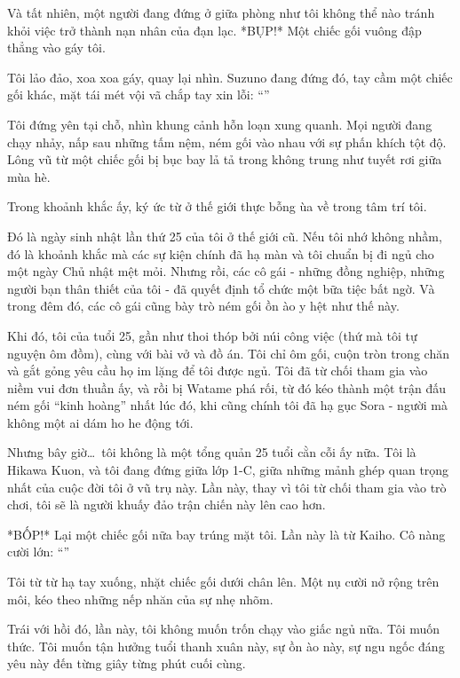 \documentclass[../main.tex]{subfiles}
\begin{document}
Và tất nhiên, một người đang đứng ở giữa phòng như tôi không thể nào tránh khỏi việc trở thành nạn nhân của đạn lạc. *BỤP!* Một chiếc gối vuông đập thẳng vào gáy tôi.

Tôi lảo đảo, xoa xoa gáy, quay lại nhìn. Suzuno đang đứng đó, tay cầm một chiếc gối khác, mặt tái mét vội vã chắp tay xin lỗi: ``''

Tôi đứng yên tại chỗ, nhìn khung cảnh hỗn loạn xung quanh. Mọi người đang chạy nhảy, nấp sau những tấm nệm, ném gối vào nhau với sự phấn khích tột độ. Lông vũ từ một chiếc gối bị bục bay lả tả trong không trung như tuyết rơi giữa mùa hè.

Trong khoảnh khắc ấy, ký ức từ ở thế giới thực bỗng ùa về trong tâm trí tôi.

Đó là ngày sinh nhật lần thứ 25 của tôi ở thế giới cũ. Nếu tôi nhớ không nhầm, đó là khoảnh khắc mà các sự kiện chính đã hạ màn và tôi chuẩn bị đi ngủ cho một ngày Chủ nhật mệt mỏi. Nhưng rồi, các cô gái \hll - những đồng nghiệp, những người bạn thân thiết của tôi - đã quyết định tổ chức một bữa tiệc bất ngờ. Và trong đêm đó, các cô gái cũng bày trò ném gối ồn ào y hệt như thế này.

Khi đó, tôi của tuổi 25, gần như thoi thóp bởi núi công việc (thứ mà tôi tự nguyện ôm đồm), cùng với bài vở và đồ án. Tôi chỉ ôm gối, cuộn tròn trong chăn và gắt gỏng yêu cầu họ im lặng để tôi được ngủ. Tôi đã từ chối tham gia vào niềm vui đơn thuần ấy, và rồi bị Watame phá rối, từ đó kéo thành một trận đấu ném gối ``kinh hoàng'' nhất lúc đó, khi cũng chính tôi đã hạ gục Sora - người mà không một ai dám ho he động tới.

Nhưng bây giờ\dots\ tôi không là một tổng quản 25 tuổi cằn cỗi ấy nữa. Tôi là Hikawa Kuon, và tôi đang đứng giữa lớp 1-C, giữa những mảnh ghép quan trọng nhất của cuộc đời tôi ở vũ trụ này. Lần này, thay vì tôi từ chối tham gia vào trò chơi, tôi sẽ là người khuấy đảo trận chiến này lên cao hơn.

*BỐP!* Lại một chiếc gối nữa bay trúng mặt tôi. Lần này là từ Kaiho. Cô nàng cười lớn: ``''

Tôi từ từ hạ tay xuống, nhặt chiếc gối dưới chân lên. Một nụ cười nở rộng trên môi, kéo theo những nếp nhăn của sự nhẹ nhõm.

Trái với hồi đó, lần này, tôi không muốn trốn chạy vào giấc ngủ nữa. Tôi muốn thức. Tôi muốn tận hưởng tuổi thanh xuân này, sự ồn ào này, sự ngu ngốc đáng yêu này đến từng giây từng phút cuối cùng.
\end{document}
